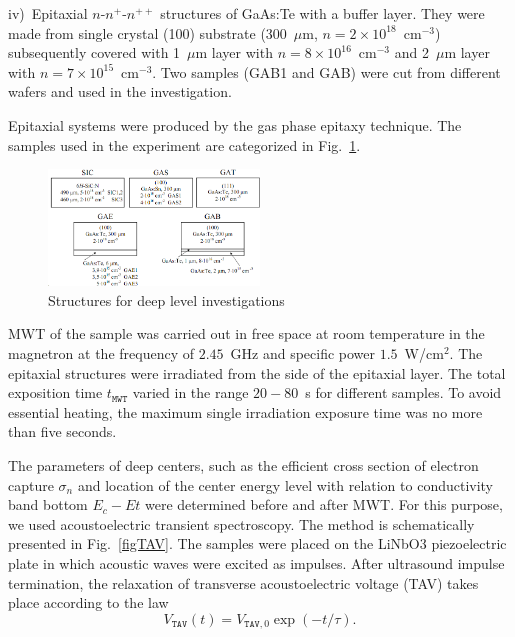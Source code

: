 \documentclass[%
 aip,jap,
 amsmath,amssymb,
 reprint,%
]{revtex4-1}
\begin{document}
\noindent
iv)~Epitaxial $n$-$n^+$-$n^{++}$ structures of GaAs:Te with a buffer layer.
 They were made from single crystal (100) substrate (300~$\mu$m, $n= 2\times10^{18}$~cm$^{-3}$)
  subsequently covered with 1~$\mu$m layer with $n=8\times10^{16}$~cm$^{-3}$ and
  2~$\mu$m layer with $n=7\times10^{15}$~cm$^{-3}$.
  Two samples (GAB1 and GAB) were cut from different wafers and used in the investigation.

Epitaxial systems were produced by the gas phase epitaxy technique.
The samples used in the experiment are categorized in Fig.~\ref{figSamp_TAV}.

\begin{figure}
\includegraphics[width=0.5\textwidth]{Fig1}
\caption{\label{figSamp_TAV}
Structures for deep level investigations
}%
\end{figure}

MWT of the sample was carried out in free space at room temperature in the magnetron at the frequency of  $2.45$~GHz
and specific power $1.5$~W/cm$^{2}$.
The epitaxial structures were irradiated from the side of the epitaxial layer.
The total exposition time $t_\mathtt{MWT}$ varied in the range $20-80$~s for different samples.
To avoid essential heating, the maximum single irradiation exposure time was no more than  five seconds.


The parameters of deep centers, such as the efficient cross section of electron capture $\sigma_n$
and location of the center energy level with relation to conductivity band bottom $E_c-Et$ were determined before and after MWT.
For this purpose, we used acoustoelectric transient spectroscopy. \cite{OstrovPAN,OlikhSSC,PANnewEn,OstrovskiiSST}
The method is schematically presented in Fig.~\ref{figTAV}.
The samples were placed on the LiNbO3 piezoelectric plate in which acoustic waves were excited as impulses.
After ultrasound impulse termination, the relaxation of transverse acoustoelectric voltage (TAV) takes place according to the law
\begin{equation}\label{eqVtav}
  V_\mathtt{TAV}(t)=V_{\mathtt{TAV},0}\exp(-t/\tau).
\end{equation}
\end{document}
